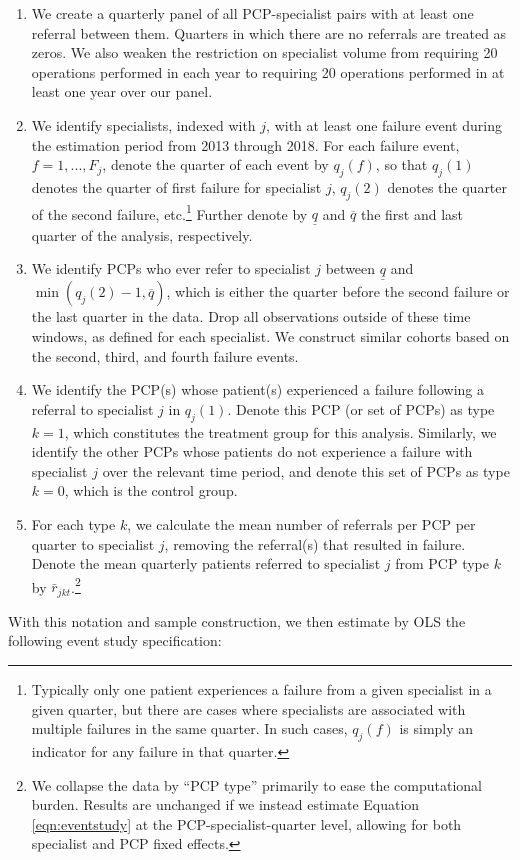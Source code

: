 \documentclass[12pt]{article}
\begin{document}
\begin{enumerate}
\item We create a quarterly panel of all PCP-specialist pairs with at least one referral between them. Quarters in which there are no referrals are treated as zeros. We also weaken the restriction on specialist volume from requiring 20 operations performed in each year to requiring 20 operations performed in at least one year over our panel.

\item We identify specialists, indexed with $j$, with at least one failure event during the estimation period from 2013 through 2018. For each failure event, $f=1,...,F_{j}$, denote the quarter of each event by $q_{j}(f)$, so that $q_{j}(1)$ denotes the quarter of first failure for specialist $j$, $q_{j}(2)$ denotes the quarter of the second failure, etc.\footnote{Typically only one patient experiences a failure from a given specialist in a given quarter, but there are cases where specialists are associated with multiple failures in the same quarter. In such cases, $q_{j}(f)$ is simply an indicator for any failure in that quarter.} Further denote by $\underline{q}$ and $\overline{q}$ the first and last quarter of the analysis, respectively.

\item We identify PCPs who ever refer to specialist $j$ between $\underline{q}$ and $\min(q_{j}(2)-1, \overline{q})$, which is either the quarter before the second failure or the last quarter in the data. Drop all observations outside of these time windows, as defined for each specialist. We construct similar cohorts based on the second, third, and fourth failure events.

\item We identify the PCP(s) whose patient(s) experienced a failure following a referral to specialist $j$ in $q_j(1)$. Denote this PCP (or set of PCPs) as type $k=1$, which constitutes the treatment group for this analysis. Similarly, we identify the other PCPs whose patients do not experience a failure with specialist $j$ over the relevant time period, and denote this set of PCPs as type $k=0$, which is the control group.

\item For each type $k$, we calculate the mean number of referrals per PCP per quarter to specialist $j$, removing the referral(s) that resulted in failure. Denote the mean quarterly patients referred to specialist $j$ from PCP type $k$ by $\bar{r}_{jkt}$.\footnote{We collapse the data by ``PCP type'' primarily to ease the computational burden. Results are unchanged if we instead estimate Equation \ref{eqn:eventstudy} at the PCP-specialist-quarter level, allowing for both specialist and PCP fixed effects.}
\end{enumerate}
With this notation and sample construction, we then estimate by OLS the following event study specification:
\end{document}
